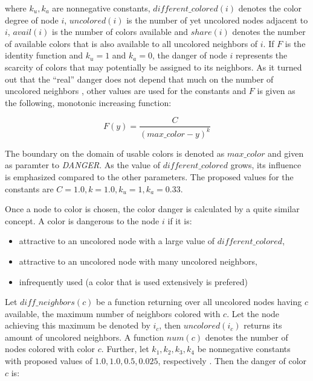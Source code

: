 where $k_u, k_a$ are nonnegative constants, $\mathit{different\_colored}(i)$ denotes the color degree of node $i$, $\mathit{uncolored}(i)$ is the number of yet uncolored nodes adjacent to $i$, $\mathit{avail}(i)$ is the number of colors available and $\mathit{share}(i)$ denotes the number of available colors that is also available to all uncolored neighbors of $i$. If $F$ is the identity function and $k_u=1$ and $k_a=0$, the danger of node $i$ represents the scarcity of colors that may potentially be assigned to its neighbors. As it turned out that the ``real'' danger does not depend that much on the number of uncolored neighbors \cite{glover-96}, other values are used for the constants and $F$ is given as the following, monotonic increasing function:

$$ F(y) = \frac{C}{(\mathit{max\_color}-y)^k} $$

The boundary on the domain of usable colors is denoted as $\mathit{max\_color}$ and given as paramter to \textit{DANGER}. As the value of $\mathit{different\_colored}$ grows, its influence is emphasized compared to the other parameters. The proposed values for the constants are $C=1.0, k=1.0, k_u=1, k_a=0.33$.


Once a node to color is chosen, the color danger is calculated by a quite similar concept. A color is dangerous to the node $i$ if it is:

\begin{itemize}
\item attractive to an uncolored node with a large value of $\mathit{different\_colored}$,
\item attractive to an uncolored node with many uncolored neighbors,
\item infrequently used (a color that is used extensively is prefered)
\end{itemize}

Let $\mathit{diff\_neighbors}(c)$ be a function returning over all uncolored nodes having $c$ available, the maximum number of neighbors colored with $c$. Let the node achieving this maximum be denoted by $i_c$, then $\mathit{uncolored}(i_c)$ returns its amount of uncolored neighbors. A function $num(c)$ denotes the number of nodes colored with color $c$. Further, let $k_1,k_2,k_3,k_4$ be nonnegative constants with proposed values of $1.0,1.0,0.5,0.025$, respectively \cite{glover-96}. Then the danger of color $c$ is:

